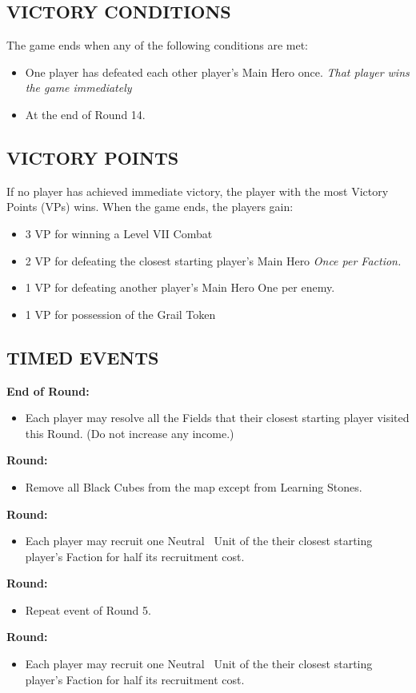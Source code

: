 \begin{multicols*}{2}
\subsection*{\MakeUppercase{Victory Conditions}}
The game ends when any of the following conditions are met:
\begin{itemize}
  \item One player has defeated each other player's Main Hero once. \textit{That player wins the game immediately}
  \item At the end of Round 14.
\end{itemize}

\subsection*{\MakeUppercase{Victory Points}}
If no player has achieved immediate victory, the player with the most Victory Points (VPs) wins. When the game ends, the players gain:
\begin{itemize}
  \item 3 VP for winning a Level VII Combat
  \item 2 VP for defeating the closest starting player's Main Hero \textit{Once per Faction.}
  \item 1 VP for defeating another player's Main Hero {One per enemy.}
  \item 1 VP for possession of the Grail Token
\end{itemize}

\subsection*{\MakeUppercase{Timed Events}}
\textbf{End of  Round:}
\begin{itemize}
  \item Each player may resolve all the Fields that their closest starting player visited this Round. (Do not increase any income.)
\end{itemize}
\textbf{ Round:}
\begin{itemize}
  \item Remove all Black Cubes from the map except from Learning Stones.
\end{itemize}
\textbf{ Round:}
\begin{itemize}
  \item Each player may recruit one Neutral \silver\ Unit of the their closest starting player's Faction for half its recruitment cost.
\end{itemize}
\textbf{ Round:}
\begin{itemize}
  \item Repeat event of Round 5.
\end{itemize}
\textbf{ Round:}
\begin{itemize}
  \item Each player may recruit one Neutral \silver\ Unit of the their closest starting player's Faction for half its recruitment cost.
\end{itemize}


\end{multicols*}
